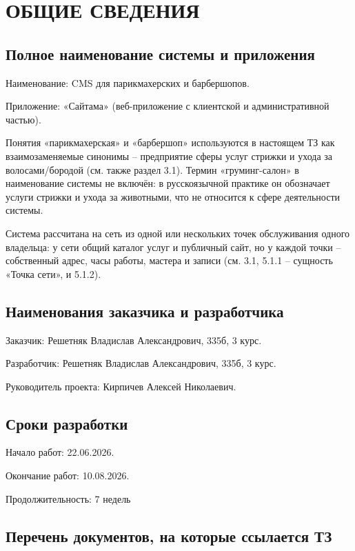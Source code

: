 \newpage
\tableofcontents
\newpage

\section{ОБЩИЕ СВЕДЕНИЯ}

\subsection{Полное наименование системы и приложения}

Наименование: CMS для парикмахерских и барбершопов.

Приложение: «Сайтама» (веб-приложение с клиентской и административной частью).

Понятия «парикмахерская» и «барбершоп» используются в настоящем ТЗ как взаимозаменяемые синонимы -- предприятие сферы услуг стрижки и ухода за волосами/бородой (см. также раздел 3.1). Термин «груминг-салон» в наименование системы не включён: в русскоязычной практике он обозначает услуги стрижки и ухода за животными, что не относится к сфере деятельности системы.

Система рассчитана на сеть из одной или нескольких точек обслуживания одного владельца: у сети общий каталог услуг и публичный сайт, но у каждой точки -- собственный адрес, часы работы, мастера и записи (см. 3.1, 5.1.1 -- сущность «Точка сети», и 5.1.2).

\subsection{Наименования заказчика и разработчика}

Заказчик: Решетняк Владислав Александрович, 335б, 3 курс.

Разработчик: Решетняк Владислав Александрович, 335б, 3 курс.

Руководитель проекта: Кирпичев Алексей Николаевич.

\subsection{Сроки разработки}

Начало работ: 22.06.2026.

Окончание работ: 10.08.2026.

Продолжительность: 7 недель

\subsection{Перечень документов, на которые ссылается ТЗ}

